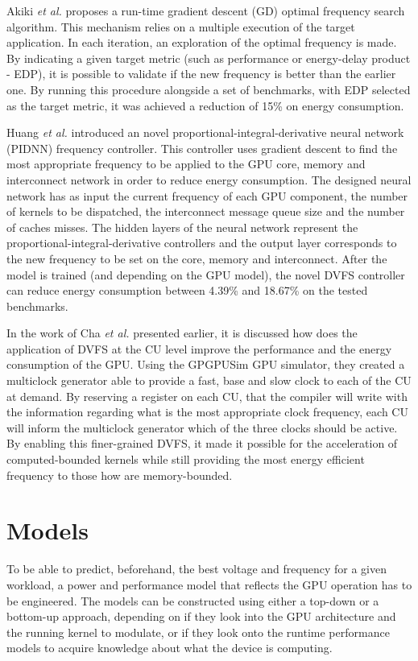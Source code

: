 Akiki \textit{et al.} \cite{akiki_energy-aware_2018} proposes a run-time gradient descent (GD) optimal frequency search algorithm. This mechanism relies on a multiple execution of the target application. In each iteration, an exploration of the optimal frequency is made. By indicating a given target metric (such as performance or energy-delay product - EDP), it is possible to validate if the new frequency is better than the earlier one. By running this procedure alongside a set of benchmarks, with EDP selected as the target metric, it was achieved a reduction of 15\% on energy consumption.

Huang \textit{et al.} \cite{huang_gpu_2019} introduced an novel proportional-integral-derivative neural network (PIDNN) frequency controller. This controller uses gradient descent to find the most appropriate frequency to be applied to the GPU core, memory and interconnect network in order to reduce energy consumption. The designed neural network has as input the current frequency of each GPU component, the number of kernels to be dispatched, the interconnect message queue size and the number of caches misses. The hidden layers of the neural network represent the proportional-integral-derivative controllers and the output layer corresponds to the new frequency to be set on the core, memory and interconnect. After the model is trained (and depending on the GPU model), the novel DVFS controller can reduce energy consumption between 4.39\% and 18.67\% on the tested benchmarks.

In the work of Cha \textit{et al.} \cite{cha_core-level_2018} presented earlier, it is discussed how does the application of DVFS at the CU level improve the performance and the energy consumption of the GPU. Using the GPGPUSim GPU simulator, they created a multiclock generator able to provide a fast, base and slow clock to each of the CU at demand.  By reserving a register on each CU, that the compiler will write with the information regarding what is the most appropriate clock frequency, each CU will inform the multiclock generator which of the three clocks should be active. By enabling this finer-grained DVFS, it made it possible for the acceleration of computed-bounded kernels while still providing the most energy efficient frequency to those how are memory-bounded.

\section{Models}
\label{section:Models}
To be able to predict, beforehand, the best voltage and frequency for a given workload, a power and performance model that reflects the GPU operation has to be engineered. The models can be constructed using either a top-down or a bottom-up approach, depending on if they look into the GPU architecture and the running kernel to modulate, or if they look onto the runtime performance models to acquire knowledge about what the device is computing.

